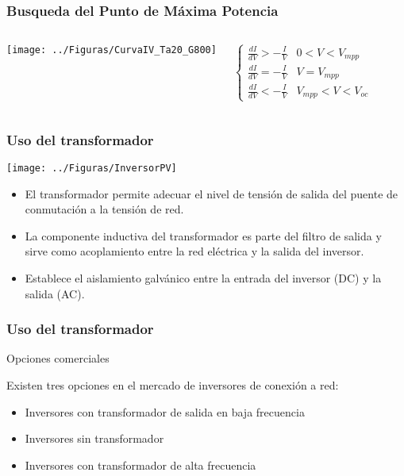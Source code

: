 \documentclass[serif, xcolor=dvipsnames]{beamer}
\begin{document}
\begin{frame}
  \frametitle{Busqueda del Punto de Máxima Potencia}
  \begin{columns}[c]%


    \column{6cm}

    \texttt{[image: ../Figuras/CurvaIV\_Ta20\_G800]}


    \column{6cm}

    \[
    \begin{cases}
      \frac{dI}{dV}>-\frac{I}{V} & 0<V<V_{mpp}\\
      \frac{dI}{dV}=-\frac{I}{V} & V=V_{mpp}\\
      \frac{dI}{dV}<-\frac{I}{V} & V_{mpp}<V<V_{oc}\end{cases}\]


  \end{columns}%

\end{frame}
\begin{frame}[plain]
  \frametitle{Uso del transformador}

  \begin{center}
    \texttt{[image: ../Figuras/InversorPV]}
    \par\end{center}
  \begin{itemize}
  \item El transformador permite adecuar el nivel de tensión de salida
    del puente de conmutación a la tensión de red.
  \item La componente inductiva del transformador es parte del filtro
    de salida y sirve como acoplamiento entre la red eléctrica y la
    salida del inversor.
  \item Establece el aislamiento galvánico entre la entrada del
    inversor (DC) y la salida (AC).
  \end{itemize}

\end{frame}
\begin{frame}
  \frametitle{Uso del transformador}
  \begin{block} {Opciones comerciales}

    Existen tres opciones en el mercado de inversores de conexión a
    red:
    \begin{itemize}
    \item Inversores con transformador de salida en baja frecuencia
    \item Inversores sin transformador
    \item Inversores con transformador de alta frecuencia
    \end{itemize}
  \end{block}

\end{frame}
\end{document}
